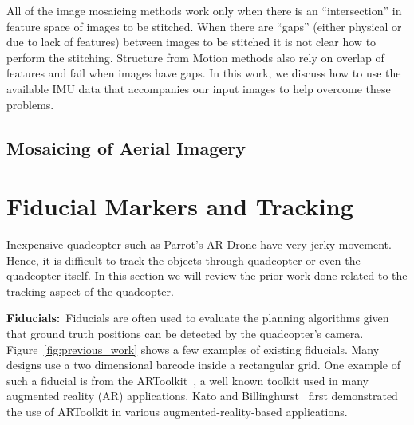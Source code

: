All of the image mosaicing methods work only when there is an
``intersection'' in feature space of images to be stitched. When there
are ``gaps'' (either physical or due to lack of features) between
images to be stitched it is not clear how to perform the
stitching. Structure from Motion methods also rely on overlap of
features and fail when images have gaps. In this work, we discuss how
to use the available IMU data that accompanies our input images to
help overcome these problems.

\subsection{Mosaicing of Aerial Imagery}


\section{Fiducial Markers and Tracking}
Inexpensive quadcopter such as Parrot's AR Drone have very jerky movement. Hence,
it is difficult to track the objects through quadcopter or even the quadcopter
itself. In this section we will review the prior work done related to the
tracking aspect of the quadcopter.

\textbf{Fiducials:}~Fiducials are often used to evaluate the planning
algorithms given that ground truth positions can be detected by the
quadcopter's camera. Figure~\ref{fig:previous_work} shows a few
examples of existing fiducials.  Many designs use a two
dimensional barcode inside a rectangular grid. One example of such a
fiducial is from the ARToolkit~\cite{ARToolkit02}, a well known
toolkit used in many augmented reality (AR) applications. Kato and
Billinghurst~\cite{kato-artoolkit} first demonstrated the use of
ARToolkit in various augmented-reality-based applications.

